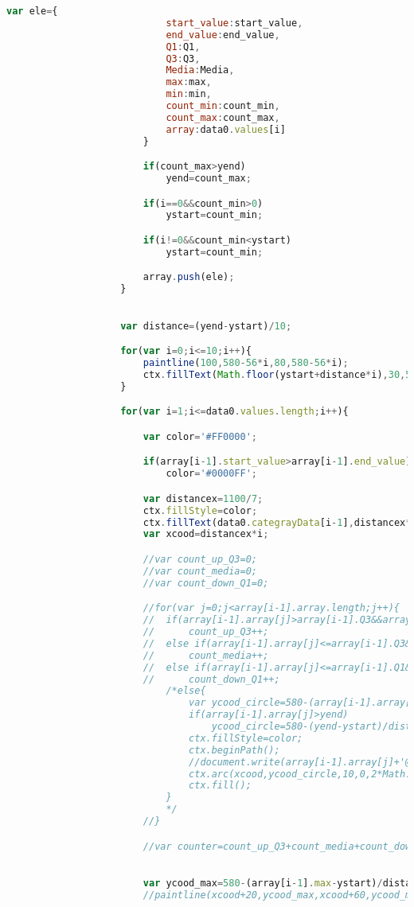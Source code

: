 \begin{lstlisting}[language = javascript]
						var ele={
							start_value:start_value,
							end_value:end_value,
							Q1:Q1,
							Q3:Q3,
							Media:Media,
							max:max,
							min:min,
							count_min:count_min,
							count_max:count_max,
							array:data0.values[i]
						}

						if(count_max>yend)
							yend=count_max;

						if(i==0&&count_min>0)
							ystart=count_min;

						if(i!=0&&count_min<ystart)
							ystart=count_min;

						array.push(ele);
					}

					
					var distance=(yend-ystart)/10;

					for(var i=0;i<=10;i++){
						paintline(100,580-56*i,80,580-56*i);
						ctx.fillText(Math.floor(ystart+distance*i),30,580-56*i);
					}

					for(var i=1;i<=data0.values.length;i++){

						var color='#FF0000';

						if(array[i-1].start_value>array[i-1].end_value)
							color='#0000FF';

						var distancex=1100/7;
						ctx.fillStyle=color;
						ctx.fillText(data0.categrayData[i-1],distancex*i,600);
						var xcood=distancex*i;

						//var count_up_Q3=0;
						//var count_media=0;
						//var count_down_Q1=0;

						//for(var j=0;j<array[i-1].array.length;j++){
						//	if(array[i-1].array[j]>array[i-1].Q3&&array[i-1].array[j]<=array[i-1].count_max)
						//		count_up_Q3++;
						//	else if(array[i-1].array[j]<=array[i-1].Q3&&array[i-1].array[j]>array[i-1].Q1)
						//		count_media++;
						//	else if(array[i-1].array[j]<=array[i-1].Q1&&array[i-1].array[j]>array[i-1].count_min)
						//		count_down_Q1++;
							/*else{
								var ycood_circle=580-(array[i-1].array[j]-ystart)/distance*56;
								if(array[i-1].array[j]>yend)
									ycood_circle=580-(yend-ystart)/distance*56;
								ctx.fillStyle=color;
								ctx.beginPath();
								//document.write(array[i-1].array[j]+'@'+ystart+'@'+xcood+'@'+ycood_circle);
								ctx.arc(xcood,ycood_circle,10,0,2*Math.PI);
								ctx.fill();
							}
							*/
						//}

						//var counter=count_up_Q3+count_media+count_down_Q1;
						

						var ycood_max=580-(array[i-1].max-ystart)/distance*56;
						//paintline(xcood+20,ycood_max,xcood+60,ycood_max);


\end{lstlisting}
